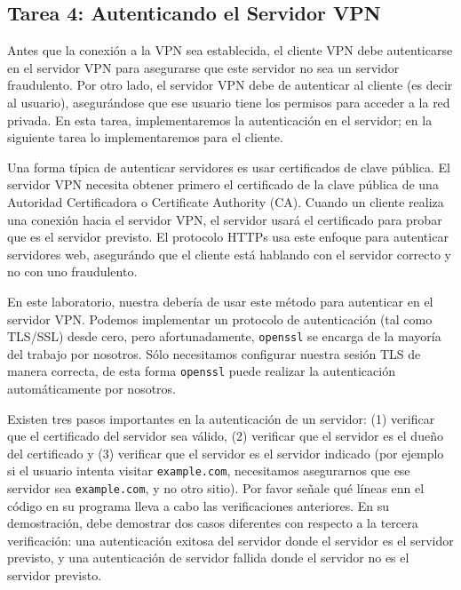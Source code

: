 \subsection{Tarea 4: Autenticando el Servidor VPN}

Antes que la conexión a la VPN sea establecida, el cliente VPN debe autenticarse en el servidor VPN para asegurarse que este servidor no sea un servidor fraudulento.
Por otro lado, el servidor VPN debe de autenticar al cliente (es decir al usuario), asegurándose que ese usuario tiene los permisos para acceder a la red privada.
En esta tarea, implementaremos la autenticación en el servidor; en la siguiente tarea lo implementaremos para el cliente.

Una forma típica de autenticar servidores es usar certificados de clave pública. El servidor VPN necesita obtener primero el certificado de la clave pública de una Autoridad Certificadora o Certificate Authority (CA). Cuando un cliente realiza una conexión hacia el servidor VPN, el servidor usará el certificado para probar que es el servidor previsto.
El protocolo HTTPs usa este enfoque para autenticar servidores web, asegurándo que el cliente está hablando con el servidor correcto y no con uno fraudulento.

En este laboratorio, nuestra \miniVPN debería de usar este método para autenticar en el servidor VPN. Podemos implementar un protocolo de autenticación (tal como TLS/SSL) desde cero, pero afortunadamente, \texttt{openssl} se encarga de la mayoría del trabajo por nosotros. Sólo necesitamos configurar nuestra sesión TLS de manera correcta, de esta forma \texttt{openssl} puede realizar la autenticación automáticamente por nosotros.

Existen tres pasos importantes en la autenticación de un servidor: (1) verificar que el certificado del servidor sea válido, (2) verificar que el servidor es el dueño del certificado y (3) verificar que el servidor es el servidor indicado (por ejemplo si el usuario intenta visitar \texttt{example.com}, necesitamos asegurarnos que ese servidor sea \texttt{example.com}, y no otro sitio). Por favor señale qué líneas enn el código en su programa lleva a cabo las verificaciones anteriores.
En su demostración, debe demostrar dos casos diferentes con respecto a la tercera verificación: una autenticación exitosa del servidor donde el servidor es el servidor previsto, y una autenticación de servidor fallida donde el servidor no es el servidor previsto.


